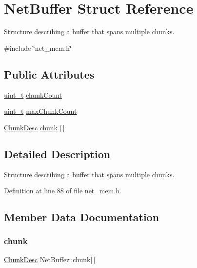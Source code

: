 \hypertarget{structNetBuffer}{}\section{Net\+Buffer Struct Reference}
\label{structNetBuffer}


Structure describing a buffer that spans multiple chunks.  




{\ttfamily \#include \char`\"{}net\+\_\+mem.\+h\char`\"{}}

\subsection*{Public Attributes}
\begin{DoxyCompactItemize}
\item 
\hyperlink{compiler__port_8h_a12a1e9b3ce141648783a82445d02b58d}{uint\+\_\+t} \hyperlink{structNetBuffer_a43ab1f87d0236d4e01c19ff14f899618}{chunk\+Count}
\item 
\hyperlink{compiler__port_8h_a12a1e9b3ce141648783a82445d02b58d}{uint\+\_\+t} \hyperlink{structNetBuffer_a6c71e1c9f8122aa63841d14b2a426734}{max\+Chunk\+Count}
\item 
\hyperlink{structChunkDesc}{Chunk\+Desc} \hyperlink{structNetBuffer_a5d399f3f37224030dcac9c4da3ca41eb}{chunk} \mbox{[}$\,$\mbox{]}
\end{DoxyCompactItemize}


\subsection{Detailed Description}
Structure describing a buffer that spans multiple chunks. 

Definition at line 88 of file net\+\_\+mem.\+h.



\subsection{Member Data Documentation}
\mbox{\label{structNetBuffer_a5d399f3f37224030dcac9c4da3ca41eb}} 
\subsubsection{\texorpdfstring{chunk}{chunk}}
{\footnotesize\ttfamily \hyperlink{structChunkDesc}{Chunk\+Desc} Net\+Buffer\+::chunk\mbox{[}$\,$\mbox{]}}



